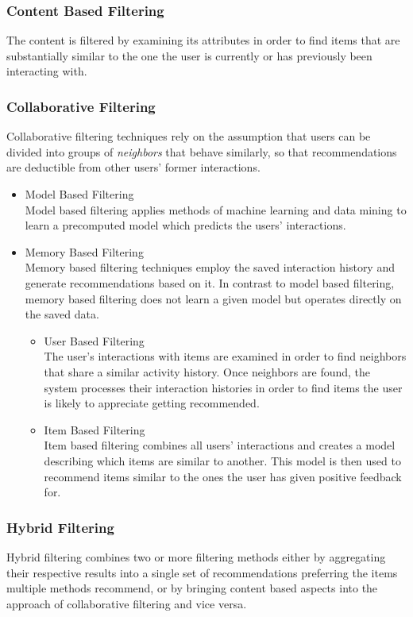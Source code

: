 \subsubsection{Content Based Filtering}
	The content is filtered by examining its attributes in order to find items that are substantially similar to the one the user is currently or has previously been interacting with.
\subsubsection{Collaborative Filtering}
	Collaborative filtering techniques rely on the assumption that users can be divided into groups of \textit{neighbors} that behave similarly, so that recommendations are deductible from other users' former interactions.
	\begin{itemize}
		\item Model Based Filtering\\
		Model based filtering applies methods of machine learning and data mining to learn a precomputed model which predicts the users' interactions.
		\item Memory Based Filtering\\
		Memory based filtering techniques employ the saved interaction history and generate recommendations based on it. In contrast to model based filtering, memory based filtering does not learn a given model but operates directly on the saved data.
		\begin{itemize}
			\item User Based Filtering\\
			The user's interactions with items are examined in order to find neighbors that share a similar activity history. Once neighbors are found, the system processes their interaction histories in order to find items the user is likely to appreciate getting recommended.
			\item Item Based Filtering\\
			Item based filtering combines all users' interactions and creates a model describing which items are similar to another. This model is then used to recommend items similar to the ones the user has given positive feedback for.
		\end{itemize}
	\end{itemize}
\subsubsection{Hybrid Filtering}
Hybrid filtering combines two or more filtering methods either by aggregating their respective results into a single set of recommendations preferring the items multiple methods recommend, or by bringing content based aspects into the approach of collaborative filtering and vice versa.

